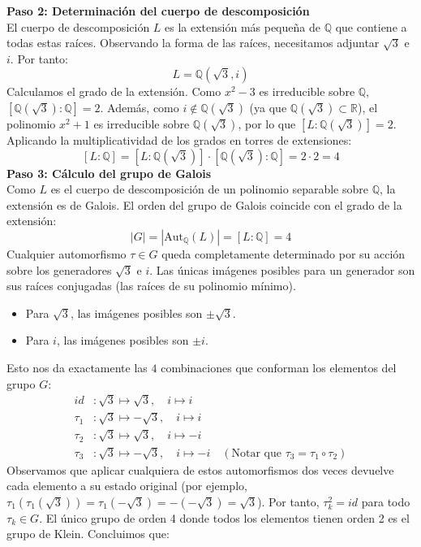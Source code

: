 \begin{enumerate}
\begin{dem}
\textbf{Paso 2: Determinación del cuerpo de descomposición} \\
El cuerpo de descomposición $L$ es la extensión más pequeña de $\mathbb{Q}$ que contiene a todas estas raíces. Observando la forma de las raíces, necesitamos adjuntar $\sqrt{3}$ e $i$. Por tanto:
$$ L = \mathbb{Q}(\sqrt{3}, i) $$
Calculamos el grado de la extensión. Como $x^2-3$ es irreducible sobre $\mathbb{Q}$, $[\mathbb{Q}(\sqrt{3}) : \mathbb{Q}] = 2$. Además, como $i \notin \mathbb{Q}(\sqrt{3})$ (ya que $\mathbb{Q}(\sqrt{3}) \subset \mathbb{R}$), el polinomio $x^2+1$ es irreducible sobre $\mathbb{Q}(\sqrt{3})$, por lo que $[L : \mathbb{Q}(\sqrt{3})] = 2$.
Aplicando la multiplicatividad de los grados en torres de extensiones:
$$ [L : \mathbb{Q}] = [L : \mathbb{Q}(\sqrt{3})] \cdot [\mathbb{Q}(\sqrt{3}) : \mathbb{Q}] = 2 \cdot 2 = 4 $$
\textbf{Paso 3: Cálculo del grupo de Galois} \\
Como $L$ es el cuerpo de descomposición de un polinomio separable sobre $\mathbb{Q}$, la extensión es de Galois. El orden del grupo de Galois coincide con el grado de la extensión:
$$ |G| = |\text{Aut}_{\mathbb{Q}}(L)| = [L : \mathbb{Q}] = 4 $$
Cualquier automorfismo $\tau \in G$ queda completamente determinado por su acción sobre los generadores $\sqrt{3}$ e $i$. Las únicas imágenes posibles para un generador son sus raíces conjugadas (las raíces de su polinomio mínimo).
\begin{itemize}
    \item Para $\sqrt{3}$, las imágenes posibles son $\pm\sqrt{3}$.
    \item Para $i$, las imágenes posibles son $\pm i$.
\end{itemize}
Esto nos da exactamente las $4$ combinaciones que conforman los elementos del grupo $G$:
\begin{align*}
    id&: \sqrt{3} \mapsto \sqrt{3}, \quad i \mapsto i \\
    \tau_1&: \sqrt{3} \mapsto -\sqrt{3}, \quad i \mapsto i \\
    \tau_2&: \sqrt{3} \mapsto \sqrt{3}, \quad i \mapsto -i \\
    \tau_3&: \sqrt{3} \mapsto -\sqrt{3}, \quad i \mapsto -i \quad (\text{Notar que } \tau_3 = \tau_1 \circ \tau_2)
\end{align*}
Observamos que aplicar cualquiera de estos automorfismos dos veces devuelve cada elemento a su estado original (por ejemplo, $\tau_1(\tau_1(\sqrt{3})) = \tau_1(-\sqrt{3}) = -(-\sqrt{3}) = \sqrt{3}$). 
Por tanto, $\tau_k^2 = id$ para todo $\tau_k \in G$. El único grupo de orden 4 donde todos los elementos tienen orden 2 es el grupo de Klein. Concluimos que:

\end{dem}
\end{enumerate}
